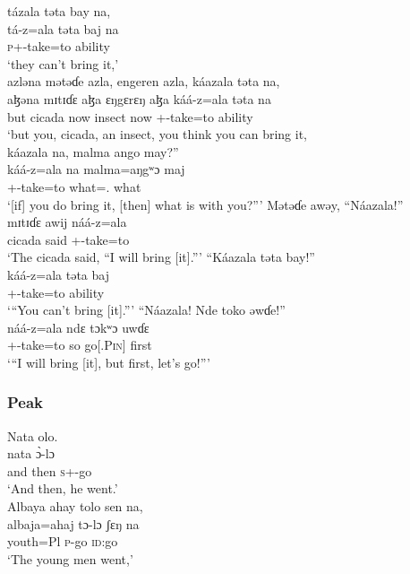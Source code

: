  \medskip
 tázala  təta  bay  na,  \\
\gll  tá-z=ala     təta baj         na \\
 \textsc{p}+{\IFV}-take=to  ability  {\NEG}   {\PSP}\\
 \glt ‘they can’t bring it,’  \\
 
 \medskip
 azləna  mətəɗe  azla,  engeren  azla,   káazala  təta  na, \\
 \gll aɮəna  mɪtɪɗɛ    aɮa   ɛŋgɛrɛŋ   aɮa káá-z=ala təta          na\\
 but    cicada    now      insect     now   {\twoS}+{\POT}-take=to    ability   {\PSP}\\
 \glt ‘but you, cicada, an insect, you think you can bring it,\\
 
 \medskip
  káazala  na,  malma  ango  may?”\\
 \gll káá-z=ala     na  malma=aŋgʷɔ    maj\\
 {\twoS}+{\POT}-take=to  {\PSP}   what={\twoS}.{\POSS}  what\\
 \glt ‘[if] you do bring it,  [then] what is with you?”’
 \z
\ea  Mətəɗe  awəy,  “Náazala!”\\                   
 \gll mɪtɪɗɛ  awij náá-z=ala\\
 cicada          said    {\oneS}+{\POT}-take=to\\      
 \glt ‘The cicada said, “I will bring [it].”’
 \z
\ea  “Káazala   təta   bay!”\\
 \gll káá-z=ala     təta     baj\\
 {\twoS}+{\POT}-take=to  ability  {\NEG}\\
 \glt ‘“You can’t bring [it].”’
 \z
\ea  “Náazala!  Nde  toko  əwɗe!”\\                
 \gll náá-z=ala ndɛ tɔkʷɔ     uwɗɛ\\
 {\oneS}+{\POT}-take=to  so  go[{\IMP}.\textsc{Pin}]    first\\
 \glt ‘“I will bring [it], but first, let’s go!”’
 \z
 \subsubsection*{Peak}
\ea  Nata  olo.\\
 \gll nata      \`ɔ-lɔ\\
 {and then}     \textsc{s}+{\PFV}-go  \\
 \glt ‘And then, he went.’\\
 \z
\ea  Albaya  ahay  tolo  sen  na,    \\
\gll albaja=ahaj   tɔ-lɔ    ʃɛŋ      na\\
 youth=Pl      \textsc{p}-go   \textsc{id}:go   {\PSP}  \\
 \glt ‘The young men went,’\\
 
